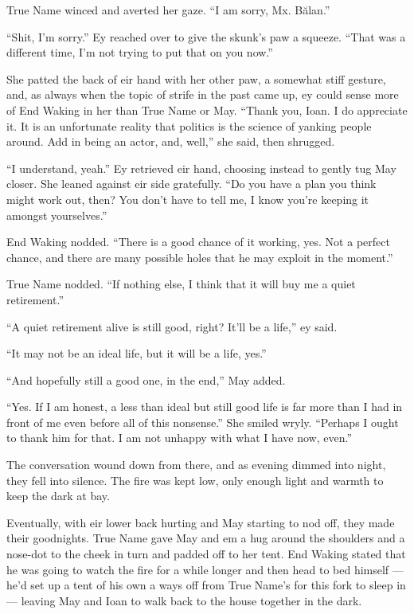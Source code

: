 True Name winced and averted her gaze. ``I am sorry, Mx. Bălan.''

``Shit, I'm sorry.'' Ey reached over to give the skunk's paw a squeeze. ``That was a different time, I'm not trying to put that on you now.''

She patted the back of eir hand with her other paw, a somewhat stiff gesture, and, as always when the topic of strife in the past came up, ey could sense more of End Waking in her than True Name or May. ``Thank you, Ioan. I do appreciate it. It is an unfortunate reality that politics is the science of yanking people around. Add in being an actor, and, well,'' she said, then shrugged.

``I understand, yeah.'' Ey retrieved eir hand, choosing instead to gently tug May closer. She leaned against eir side gratefully. ``Do you have a plan you think might work out, then? You don't have to tell me, I know you're keeping it amongst yourselves.''

End Waking nodded. ``There is a good chance of it working, yes. Not a perfect chance, and there are many possible holes that he may exploit in the moment.''

True Name nodded. ``If nothing else, I think that it will buy me a quiet retirement.''

``A quiet retirement alive is still good, right? It'll be a life,'' ey said.

``It may not be an ideal life, but it will be a life, yes.''

``And hopefully still a good one, in the end,'' May added.

``Yes. If I am honest, a less than ideal but still good life is far more than I had in front of me even before all of this nonsense.'' She smiled wryly. ``Perhaps I ought to thank him for that. I am not unhappy with what I have now, even.''

The conversation wound down from there, and as evening dimmed into night, they fell into silence. The fire was kept low, only enough light and warmth to keep the dark at bay.

Eventually, with eir lower back hurting and May starting to nod off, they made their goodnights. True Name gave May and em a hug around the shoulders and a nose-dot to the cheek in turn and padded off to her tent. End Waking stated that he was going to watch the fire for a while longer and then head to bed himself — he'd set up a tent of his own a ways off from True Name's for this fork to sleep in — leaving May and Ioan to walk back to the house together in the dark.

